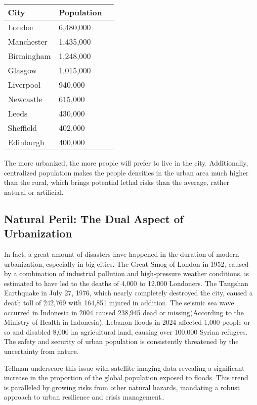 \documentclass[conference]{IEEEtran}
\begin{document}
\begin{center}
\begin{tabular}{lll}
    \toprule
    City & Population   \\
    \midrule
    London & 6,480,000\\
    Manchester & 1,435,000\\
    Birmingham & 1,248,000\\
    Glasgow & 1,015,000\\
    Liverpool & 940,000\\
    Newcastle & 615,000\\
    Leeds & 430,000\\
    Sheffield & 402,000\\
    Edinburgh & 400,000\\
    \bottomrule
\end{tabular}
\end{center}

The more urbanized, the more people will prefer to live in the city. Additionally, centralized population makes the people densities in the urban area much higher than the rural, which brings potential lethal risks than the average, rather natural or artificial. 

\subsection{Natural Peril: The Dual Aspect of Urbanization}

In fact, a great amount of disasters have happened in the duration of modern urbanization, especially in big cities. The Great Smog of London in 1952, caused by a combination of industrial pollution and high-pressure weather conditions, is estimated to have led to the deaths of 4,000 to 12,000 Londoners\cite{b8}. The Tangshan Earthquake in July 27, 1976, which nearly completely destroyed the city, caused a death toll of 242,769 with 164,851 injured in addition\cite{b9}. The seismic sea wave occurred in Indonesia in 2004 caused 238,945 dead or missing(According to the Ministry of Health in Indonesia). Lebanon floods in 2024 affected 1,000 people or so and disabled 8,000 ha agricultural land, causing over 100,000 Syrian refugees\cite{b10}. The safety and security of urban population is consistently threatened by the uncertainty from nature.

Tellman underscore this issue with satellite imaging data revealing a significant increase in the proportion of the global population exposed to floods. This trend is paralleled by growing risks from other natural hazards, mandating a robust approach to urban resilience and crisis management.\cite{b17}.
\end{document}
